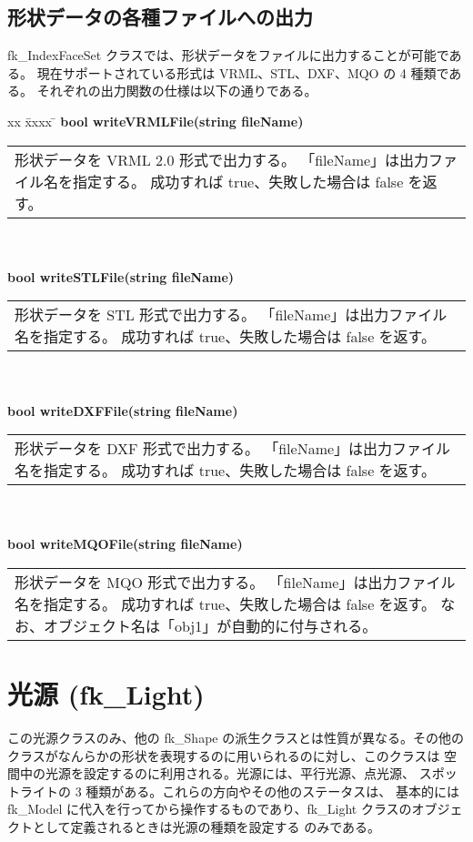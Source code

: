 \subsection{形状データの各種ファイルへの出力}
fk\_IndexFaceSet クラスでは、形状データをファイルに出力することが可能である。
現在サポートされている形式は VRML、STL、DXF、MQO の 4 種類である。
それぞれの出力関数の仕様は以下の通りである。
\begin{tabbing}
xx \= xxxx \= \kill
\> \textbf{bool writeVRMLFile(string fileName)} \\
	\> \> \begin{tabular}{p{15cm}}
		形状データを VRML 2.0 形式で出力する。
		「fileName」は出力ファイル名を指定する。
		成功すれば true、失敗した場合は false を返す。
	\end{tabular} \\ \\

\> \textbf{bool writeSTLFile(string fileName)} \\
	\> \> \begin{tabular}{p{15cm}}
		形状データを STL 形式で出力する。
		「fileName」は出力ファイル名を指定する。
		成功すれば true、失敗した場合は false を返す。
	\end{tabular} \\ \\

\> \textbf{bool writeDXFFile(string fileName)} \\
	\> \> \begin{tabular}{p{15cm}}
		形状データを DXF 形式で出力する。
		「fileName」は出力ファイル名を指定する。
		成功すれば true、失敗した場合は false を返す。
	\end{tabular} \\ \\

\> \textbf{bool writeMQOFile(string fileName)} \\
	\> \> \begin{tabular}{p{15cm}}
		形状データを MQO 形式で出力する。
		「fileName」は出力ファイル名を指定する。
		成功すれば true、失敗した場合は false を返す。
		なお、オブジェクト名は「obj1」が自動的に付与される。		
	\end{tabular}
\end{tabbing}

\section{光源 (fk\_Light)}
この光源クラスのみ、他の fk\_Shape の派生クラスとは性質が異なる。その他の
クラスがなんらかの形状を表現するのに用いられるのに対し、このクラスは
空間中の光源を設定するのに利用される。光源には、平行光源、点光源、
スポットライトの 3 種類がある。これらの方向やその他のステータスは、
基本的には fk\_Model に代入を行ってから操作するものであり、fk\_Light
クラスのオブジェクトとして定義されるときは光源の種類を設定する
のみである。

